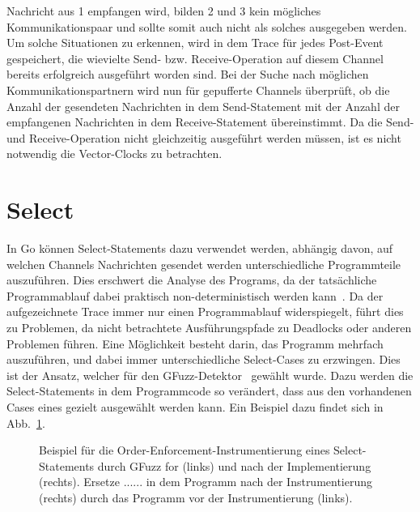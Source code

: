 Nachricht aus 1 empfangen wird, bilden 2 und 3 kein mögliches Kommunikationspaar
und sollte somit auch nicht als solches ausgegeben werden. Um solche Situationen 
zu erkennen, wird in dem Trace für jedes Post-Event gespeichert, die 
wievielte Send- bzw. Receive-Operation auf diesem Channel bereits erfolgreich 
ausgeführt worden sind. Bei der Suche nach möglichen Kommunikationspartnern 
wird nun für gepufferte Channels überprüft, ob die Anzahl der gesendeten 
Nachrichten in dem Send-Statement mit der Anzahl der empfangenen 
Nachrichten in dem Receive-Statement übereinstimmt. Da die 
Send- und Receive-Operation nicht gleichzeitig ausgeführt werden müssen, 
ist es nicht notwendig die Vector-Clocks zu betrachten.

\section{Select}
In Go können Select-Statements dazu verwendet werden, abhängig davon, 
auf welchen Channels Nachrichten gesendet werden unterschiedliche Programmteile
auszuführen. Dies erschwert die Analyse des Programs, da der 
tatsächliche Programmablauf dabei praktisch non-deterministisch werden 
kann~\cite{select-spec}. Da der aufgezeichnete Trace immer nur einen 
Programmablauf widerspiegelt, führt dies zu Problemen, da 
nicht betrachtete Ausführungspfade zu Deadlocks oder anderen Problemen 
führen. Eine Möglichkeit besteht darin, das Programm mehrfach auszuführen, 
und dabei immer unterschiedliche Select-Cases zu erzwingen. Dies ist der Ansatz,
welcher für den GFuzz-Detektor~\cite{gfuzz} gewählt wurde. Dazu werden die 
Select-Statements in dem Programmcode so verändert, dass aus den vorhandenen 
Cases eines gezielt ausgewählt werden kann. Ein Beispiel dazu findet sich 
in Abb.~\ref{Chap:Analyze-Sec:Channel-SubSec:Select-Fig:GFuzz_Inst}.
\begin{figure}[h!]
  \begin{minipage}[t]{0.3\textwidth}
    
  \end{minipage}
  \begin{minipage}[t]{0.65\textwidth}
    
  \end{minipage}
  \caption{Beispiel für die Order-Enforcement-Instrumentierung eines Select-Statements 
  durch GFuzz for (links) und nach der Implementierung (rechts). Ersetze $......$
  in dem Programm nach der Instrumentierung (rechts) durch das Programm vor der 
  Instrumentierung (links).~\cite[gekürzt]{gfuzz}}
  \label{Chap:Analyze-Sec:Channel-SubSec:Select-Fig:GFuzz_Inst}
\end{figure}
